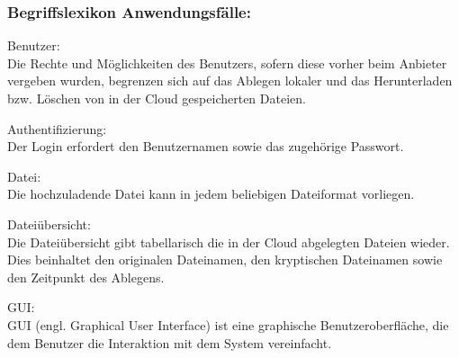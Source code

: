 \documentclass[13pt,a4paper,bibliography=totocnumbered,listof=totocnumbered]{scrartcl}
\begin{document}
\subsubsection{Begriffslexikon Anwendungsfälle:}
\begin{compactitem}
\item Benutzer:\\
Die Rechte und Möglichkeiten des Benutzers, sofern diese vorher beim Anbieter vergeben wurden, begrenzen sich auf das Ablegen lokaler und das Herunterladen bzw. Löschen von in der Cloud gespeicherten Dateien.
\item Authentifizierung:\\
Der Login erfordert den Benutzernamen sowie das zugehörige Passwort.
\item Datei:\\
Die hochzuladende Datei kann in jedem beliebigen Dateiformat vorliegen.
\item Dateiübersicht:\\
Die Dateiübersicht gibt tabellarisch die in der Cloud abgelegten Dateien wieder. Dies beinhaltet den originalen Dateinamen, den kryptischen Dateinamen  sowie den Zeitpunkt des Ablegens.
\item GUI:\\
GUI (engl. Graphical User Interface) ist eine graphische Benutzeroberfläche, die dem Benutzer die Interaktion mit dem System vereinfacht.
\end{compactitem}
\pagebreak
\end{document}
